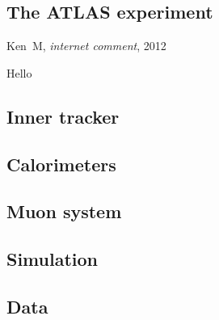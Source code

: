 \begin{singlespacing}
\chapter{The ATLAS experiment}
\label{chapter:experiment}
%
\begin{epigraphs}
%
{Ken~M,
\textit{internet comment},
2012~\cite{kenm2012inner}}
\end{epigraphs}
\end{singlespacing}

Hello


\section{Inner tracker}

\section{Calorimeters}

\section{Muon system}

\section{Simulation}

\section{Data}
